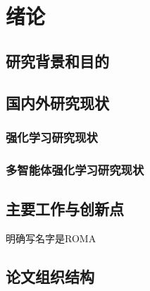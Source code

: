 
\chapter{绪论}
\section{研究背景和目的}

\section{国内外研究现状}
\subsection{强化学习研究现状}

\subsection{多智能体强化学习研究现状}

\section{主要工作与创新点}

明确写名字是ROMA

\section{论文组织结构}
